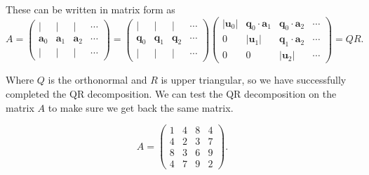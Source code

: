\documentclass[11pt]{article}
\begin{document}
These can be written in matrix form as \[A = \begin{pmatrix}
            | & | & | & \cdots \\
            \mathbf{a}_0 & \mathbf{a}_1 & \mathbf{a}_2 & \cdots \\
            | & | & | & \cdots
          \end{pmatrix}
 =
\begin{pmatrix}
  | & | & | & \cdots \\
  \mathbf{q}_0 & \mathbf{q}_1 & \mathbf{q}_2 & \cdots \\
  | & | & | & \cdots
\end{pmatrix}
\begin{pmatrix}
|\mathbf{u}_0| & \mathbf{q}_0\cdot\mathbf{a}_1 & \mathbf{q}_0\cdot\mathbf{a}_2 & \cdots \\
0           & |\mathbf{u}_1| & \mathbf{q}_1\cdot\mathbf{a}_2 & \cdots \\
0           & 0           & |\mathbf{u}_2| & \cdots
\end{pmatrix} = QR.\]

Where \(Q\) is the orthonormal and \(R\) is upper triangular, so we have
successfully completed the QR decomposition. We can test the QR
decomposition on the matrix \(A\) to make sure we get back the same
matrix.

\[{A} = \begin{pmatrix}
            1 & 4 & 8 & 4 \\
            4 & 2 & 3 & 7 \\
            8 & 3 & 6 & 9 \\
            4 & 7 & 9 & 2
          \end{pmatrix}.\]
\end{document}
